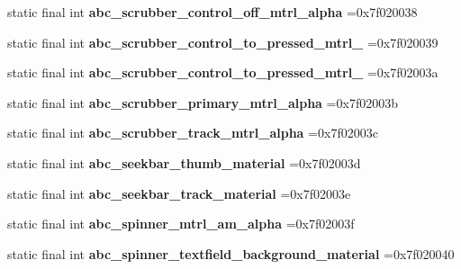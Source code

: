 \begin{DoxyCompactItemize}
static final int {\bfseries abc\+\_\+scrubber\+\_\+control\+\_\+off\+\_\+mtrl\+\_\+alpha} =0x7f020038
\item 
\mbox{\label{classproject4_1_1xaria_1_1R_1_1drawable_add75604cd865fd72aa5db9afb2e4fe28}} 
static final int {\bfseries abc\+\_\+scrubber\+\_\+control\+\_\+to\+\_\+pressed\+\_\+mtrl\+\_} =0x7f020039
\item 
\mbox{\label{classproject4_1_1xaria_1_1R_1_1drawable_a99e876ba494eaba13c2df4797fbfdc42}} 
static final int {\bfseries abc\+\_\+scrubber\+\_\+control\+\_\+to\+\_\+pressed\+\_\+mtrl\+\_} =0x7f02003a
\item 
\mbox{\label{classproject4_1_1xaria_1_1R_1_1drawable_ab4df367dd4cdddcf88ff36ed069a1c8f}} 
static final int {\bfseries abc\+\_\+scrubber\+\_\+primary\+\_\+mtrl\+\_\+alpha} =0x7f02003b
\item 
\mbox{\label{classproject4_1_1xaria_1_1R_1_1drawable_a5761039ef545754d8b2cfecdc9668360}} 
static final int {\bfseries abc\+\_\+scrubber\+\_\+track\+\_\+mtrl\+\_\+alpha} =0x7f02003c
\item 
\mbox{\label{classproject4_1_1xaria_1_1R_1_1drawable_a2e58bcde87053a1f7a4eac1b86be14e1}} 
static final int {\bfseries abc\+\_\+seekbar\+\_\+thumb\+\_\+material} =0x7f02003d
\item 
\mbox{\label{classproject4_1_1xaria_1_1R_1_1drawable_a2d7faa2fcd8448b549623bd848a548c0}} 
static final int {\bfseries abc\+\_\+seekbar\+\_\+track\+\_\+material} =0x7f02003e
\item 
\mbox{\label{classproject4_1_1xaria_1_1R_1_1drawable_a0713c523aee051f500752c25d9eedd4e}} 
static final int {\bfseries abc\+\_\+spinner\+\_\+mtrl\+\_\+am\+\_\+alpha} =0x7f02003f
\item 
\mbox{\label{classproject4_1_1xaria_1_1R_1_1drawable_afc09a49868d68e0f494bf472f819bb3f}} 
static final int {\bfseries abc\+\_\+spinner\+\_\+textfield\+\_\+background\+\_\+material} =0x7f020040

\end{DoxyCompactItemize}
